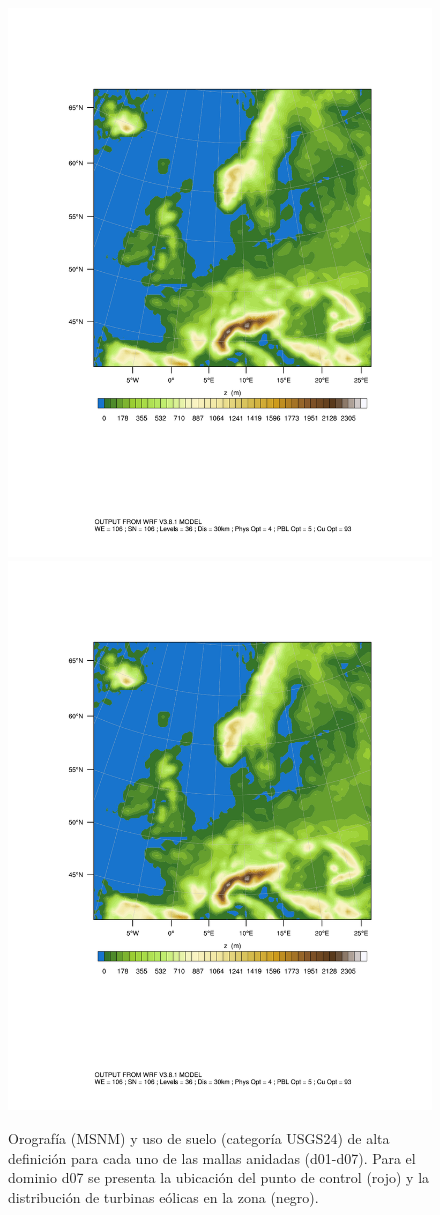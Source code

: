 \begin{figure}[H]
	\bigskip
	\includegraphics[width=0.25\linewidth,page=13,trim={2cm 6.5cm 1cm 3.5cm},clip]{Imagenes/05/hov_domain.pdf}%
	\includegraphics[width=0.25\linewidth,page=14,trim={2cm 6.5cm 1cm 3.5cm},clip]{Imagenes/05/hov_domain.pdf}%
	
	\caption{Orografía (MSNM) y uso de suelo (categoría USGS24) de alta definición para cada uno de las mallas anidadas (d01-d07). Para el dominio d07 se presenta la ubicación del punto de control (rojo) y la distribución de turbinas eólicas en la zona (negro).}
	\label{fig:dominios}
\end{figure}

